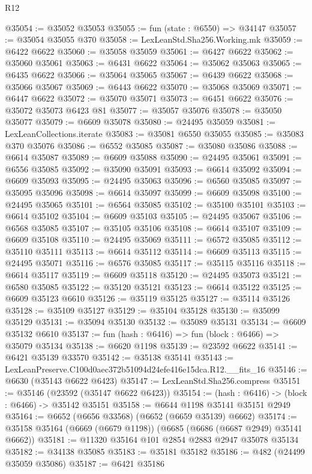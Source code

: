 \begin{lexlean}{R12}
\begin{coremodule}
@35054 := @35052 @35053
@35055 := fun (state : @6550) => @34147
@35057 := @35054 @35055 @370
@35058 := LexLeanStd.Sha256.Working.mk
@35059 := @6422 @6622
@35060 := @35058 @35059
@35061 := @6427 @6622
@35062 := @35060 @35061
@35063 := @6431 @6622
@35064 := @35062 @35063
@35065 := @6435 @6622
@35066 := @35064 @35065
@35067 := @6439 @6622
@35068 := @35066 @35067
@35069 := @6443 @6622
@35070 := @35068 @35069
@35071 := @6447 @6622
@35072 := @35070 @35071
@35073 := @6451 @6622
@35076 := @35072 @35073 @6423 @81
@35077 := @35057 @35076
@35078 := @35050 @35077
@35079 := @6609 @35078
@35080 := @24495 @35059
@35081 := LexLeanCollections.iterate
@35083 := @35081 @6550 @35055
@35085 := @35083 @370 @35076
@35086 := @6552 @35085
@35087 := @35080 @35086
@35088 := @6614 @35087
@35089 := @6609 @35088
@35090 := @24495 @35061
@35091 := @6556 @35085
@35092 := @35090 @35091
@35093 := @6614 @35092
@35094 := @6609 @35093
@35095 := @24495 @35063
@35096 := @6560 @35085
@35097 := @35095 @35096
@35098 := @6614 @35097
@35099 := @6609 @35098
@35100 := @24495 @35065
@35101 := @6564 @35085
@35102 := @35100 @35101
@35103 := @6614 @35102
@35104 := @6609 @35103
@35105 := @24495 @35067
@35106 := @6568 @35085
@35107 := @35105 @35106
@35108 := @6614 @35107
@35109 := @6609 @35108
@35110 := @24495 @35069
@35111 := @6572 @35085
@35112 := @35110 @35111
@35113 := @6614 @35112
@35114 := @6609 @35113
@35115 := @24495 @35071
@35116 := @6576 @35085
@35117 := @35115 @35116
@35118 := @6614 @35117
@35119 := @6609 @35118
@35120 := @24495 @35073
@35121 := @6580 @35085
@35122 := @35120 @35121
@35123 := @6614 @35122
@35125 := @6609 @35123 @6610
@35126 := @35119 @35125
@35127 := @35114 @35126
@35128 := @35109 @35127
@35129 := @35104 @35128
@35130 := @35099 @35129
@35131 := @35094 @35130
@35132 := @35089 @35131
@35134 := @6609 @35132 @6610
@35137 := fun (hash : @6416) => fun (block : @6466) => @35079 @35134
@35138 := @6620 @1198
@35139 := @23592 @6622
@35141 := @6421 @35139 @33570
@35142 := @35138 @35141
@35143 := LexLeanPreserve.C100d0aec372b51094d24efe416e15dca.R12.__fits_16
@35146 := @6630 (@35143 @6622 @6423)
@35147 := LexLeanStd.Sha256.compress
@35151 := @35146 (@23592 (@35147 @6622 @6423))
@35154 := (hash : @6416) -> (block : @6466) -> @35142 @35151
@35158 := @6644 @1198 @35141 @35151 @2949
@35164 := @6652 (@6656 @33568) (@6652 (@6659 @35139) @6662)
@35174 := @35158 @35164 (@6669 (@6679 @1198)) (@6685 (@6686 (@6687 @2949) @35141 @6662))
@35181 := @11320 @35164 @101 @2854 @2883 @2947 @35078 @35134
@35182 := @34138 @35085
@35183 := @35181 @35182
@35186 := @482 (@24499 @35059 @35086)
@35187 := @6421 @35186

\end{coremodule}
\end{lexlean}
